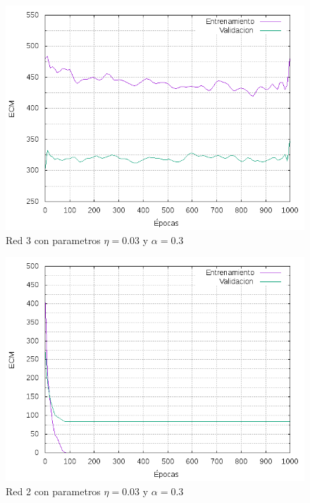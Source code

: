 \begin{figure}[h!]
  \includegraphics[width=125mm]{imagenes/ej1/ex_2-3_red_11-6-6-9-1_errors.png}
  \caption{Red 3 con parametros $\eta = 0.03 $ y $ \alpha = 0.3$}
\end{figure}

\begin{figure}[h!]
  \includegraphics[width=125mm]{imagenes/ej1/ex_2-3_red_11-21-1_errors.png}
  \caption{Red 2 con parametros $\eta = 0.03 $ y $ \alpha = 0.3$}
\end{figure}

